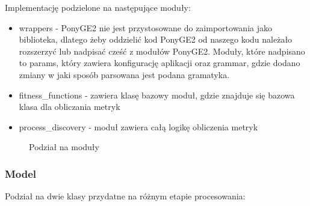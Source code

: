 Implementację podzielone na następujące moduły:
\begin{itemize}
    \item wrappers - PonyGE2 nie jest przystosowane do zaimportowania jako biblioteka, dlatego żeby oddzielić kod PonyGE2 od naszego kodu należało rozszerzyć lub nadpisać cześć z modułów PonyGE2. Moduły, które nadpisano to params, który zawiera konfigurację aplikacji oraz grammar, gdzie dodano zmiany w jaki sposób parsowana jest podana gramatyka. 
  \item fitness{\_}functions - zawiera klasę bazowy moduł, gdzie znajduje się bazowa klasa dla obliczania metryk
  \item process{\_}discovery - moduł zawiera całą logikę obliczenia metryk
\end{itemize}


\begin{figure}[!ht]
	\caption{\label{fig:flow_chart}Podział na moduły}
\end{figure}

\subsubsection{Model}

Podział na dwie klasy przydatne na różnym etapie procesowania:

